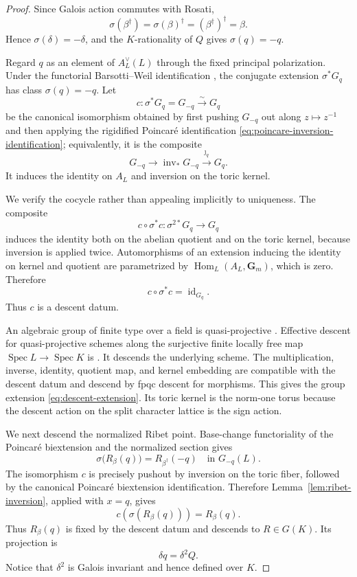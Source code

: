 \documentclass[11pt,letterpaper,reqno]{amsart}
\theoremstyle{definition}
\theoremstyle{remark}
\newcommand{\Gm}{\mathbf G_m}
\newcommand{\Hom}{\operatorname{Hom}}
\newcommand{\Spec}{\operatorname{Spec}}
\newcommand{\id}{\operatorname{id}}
\begin{document}
\begin{proof}
Since Galois action commutes with Rosati,
\[
 \sigma(\beta^\dagger)=\sigma(\beta)^\dagger
 =(\beta^\dagger)^\dagger=\beta.
\]
Hence $\sigma(\delta)=-\delta$, and the $K$-rationality of $Q$ gives
$\sigma(q)=-q$.

Regard $q$ as an element of $A_L^\vee(L)$ through the fixed principal
polarization.  Under the functorial Barsotti--Weil identification
\cite[Chapter~VII, \S3]{Serre1988}, the conjugate extension $\sigma^*G_q$ has
class $\sigma(q)=-q$.  Let
\[
 c:\sigma^*G_q=G_{-q}\xrightarrow{\sim}G_q
\]
be the canonical isomorphism obtained by first pushing $G_{-q}$ out along
$z\mapsto z^{-1}$ and then applying the rigidified Poincar\'e identification
\eqref{eq:poincare-inversion-identification}; equivalently, it is the composite
\[
 G_{-q}\longrightarrow\operatorname{inv}_*G_{-q}
 \xrightarrow{\ \jmath_q\ }G_q.
\]
It induces the identity on $A_L$ and inversion on the toric kernel.

We verify the cocycle rather than appealing implicitly to uniqueness.  The
composite
\[
 c\circ\sigma^*c:\sigma^{2*}G_q\longrightarrow G_q
\]
induces the identity both on the abelian quotient and on the toric kernel,
because inversion is applied twice.  Automorphisms of an extension inducing
the identity on kernel and quotient are parametrized by
$\Hom_L(A_L,\Gm)$, which is zero.  Therefore
\[
 c\circ\sigma^*c=\id_{G_q}.
\]
Thus $c$ is a descent datum.

An algebraic group of finite type over a field is quasi-projective
\cite[Lemma~39.8.7, Tag~0BF7]{StacksQuasiProjective}.  Effective descent for
quasi-projective schemes along the surjective finite locally free map
$\Spec L\to\Spec K$ is
\cite[Lemma~39.25.3, Tag~0CCJ]{StacksDescent}.  It descends the underlying
scheme.  The multiplication, inverse, identity, quotient map, and kernel
embedding are compatible with the descent datum and descend by fpqc descent
for morphisms.  This gives the group extension
\eqref{eq:descent-extension}.  Its toric kernel is the norm-one torus because
the descent action on the split character lattice is the sign action.

We next descend the normalized Ribet point.  Base-change functoriality of the
Poincar\'e biextension and the normalized section gives
\[
 \sigma\bigl(R_\beta(q)\bigr)=R_{\beta^\dagger}(-q)
 \quad\text{in }G_{-q}(L).
\]
The isomorphism $c$ is precisely pushout by inversion on the toric fiber,
followed by the canonical Poincar\'e biextension identification.  Therefore
Lemma~\ref{lem:ribet-inversion}, applied with $x=q$, gives
\begin{equation}\label{eq:descent-ribet-identity}
 c\!\left(\sigma(R_\beta(q))\right)=R_\beta(q).
\end{equation}
Thus $R_\beta(q)$ is fixed by the descent datum and descends to $R\in G(K)$.
Its projection is
\[
 \delta q=\delta^2Q.
\]
Notice that $\delta^2$ is Galois invariant and hence defined over $K$.


\end{proof}
\end{document}
